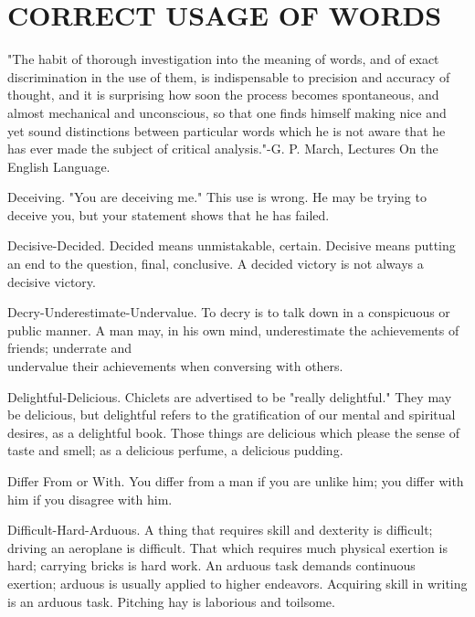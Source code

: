 \documentclass[10pt]{article}
\begin{document}
\section*{CORRECT USAGE OF WORDS}
"The habit of thorough investigation into the meaning of words, and of exact discrimination in the use of them, is indispensable to precision and accuracy of thought, and it is surprising how soon the process becomes spontaneous, and almost mechanical and unconscious, so that one finds himself making nice and yet sound distinctions between particular words which he is not aware that he has ever made the subject of critical analysis."-G. P. March, Lectures On the English Language.

Deceiving. "You are deceiving me." This use is wrong. He may be trying to deceive you, but your statement shows that he has failed.

Decisive-Decided. Decided means unmistakable, certain. Decisive means putting an end to the question, final, conclusive. A decided victory is not always a decisive victory.

Decry-Underestimate-Undervalue. To decry is to talk down in a conspicuous or public manner. A man may, in his own mind, underestimate the achievements of friends; underrate and\\
undervalue their achievements when conversing with others.

Delightful-Delicious. Chiclets are advertised to be "really delightful." They may be delicious, but delightful refers to the gratification of our mental and spiritual desires, as a delightful book. Those things are delicious which please the sense of taste and smell; as a delicious perfume, a delicious pudding.

Differ From or With. You differ from a man if you are unlike him; you differ with him if you disagree with him.

Difficult-Hard-Arduous. A thing that requires skill and dexterity is difficult; driving an aeroplane is difficult. That which requires much physical exertion is hard; carrying bricks is hard work. An arduous task demands continuous exertion; arduous is usually applied to higher endeavors. Acquiring skill in writing is an arduous task. Pitching hay is laborious and toilsome.
\end{document}
